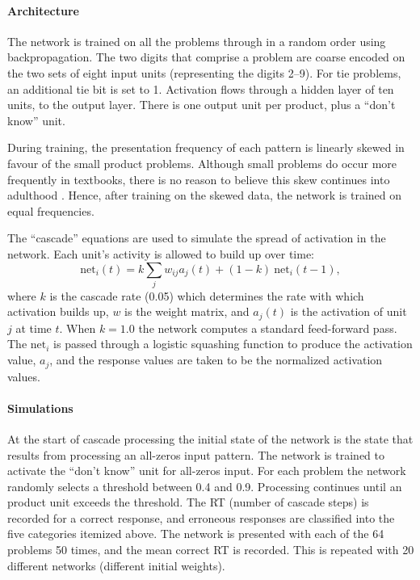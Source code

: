 \paragraph{Architecture} The network is trained on all the problems 
through  in a random order using backpropagation. The two digits that
comprise a problem are coarse encoded on the two sets of eight input units
(representing the digits 2--9).  For tie problems, an additional tie bit is
set to 1.  Activation flows through a hidden layer of ten units, to the
output layer.  There is one output unit per product, plus a ``don't
know'' unit.

During training, the presentation frequency of each pattern is
linearly skewed in favour of the small product problems. Although small
problems do occur more frequently in textbooks, there is no reason to
believe this skew continues into adulthood \cite[p. 328]{mcclmode}.  Hence,
after training on the skewed data, the network is trained on equal
frequencies.

The ``cascade'' equations \cite[p.~153]{pdp3} are used to simulate the
spread of activation in the network.  Each unit's activity is allowed to
build up over time:
\def\net{\mbox{net}}
$$\net_i(t) = k \sum\limits_j w_{ij} a_j(t) + (1-k)\ \net_i(t-1),$$
where $k$ is the
cascade rate (0.05) which determines the rate with which activation builds
up, $w$ is the weight matrix, and $a_j(t)$ is the activation of unit $j$ at
time $t$. When $k = 1.0$ the network computes a standard feed-forward pass.
The $\net_i$ is passed through a logistic squashing function to produce the
activation value, $a_j$, and the response values are taken to be the
normalized activation values.

\paragraph{Simulations} At the start of cascade processing the initial
state of the network is the state that results from processing an all-zeros
input pattern.  The network is trained to activate the ``don't know'' unit
for all-zeros input. For each problem the network randomly selects a
threshold between 0.4 and 0.9. Processing continues until an product unit
exceeds the threshold. The RT (number of cascade steps) is recorded for a
correct response, and erroneous responses are classified into the five
categories itemized above. The network is presented with each of the 64
problems 50 times, and the mean correct RT is recorded.  This is repeated
with 20 different networks (different initial weights).

